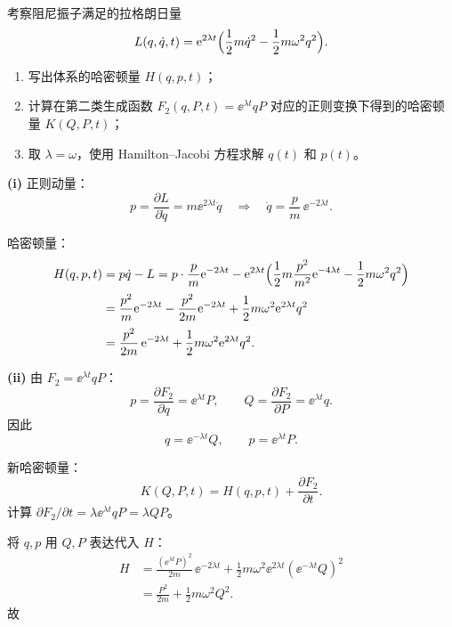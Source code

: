 \begin{question}[阻尼振子]
考察阻尼振子满足的拉格朗日量
\[
L(q,\dot q,t)=\mathrm{e}^{2\lambda t}
\Bigl(\frac12 m\dot q^{2}-\frac12 m\omega^{2}q^{2}\Bigr).
\]

\begin{enumerate}[label=(\roman*)]
  \item 写出体系的哈密顿量 $H(q,p,t)$；
  \item 计算在第二类生成函数 $F_{2}(q,P,t)=\ee^{\lambda t}qP$ 对应的正则变换下得到的哈密顿量 $K(Q,P,t)$；
  \item 取 $\lambda=\omega$，使用 Hamilton--Jacobi 方程求解 $q(t)$ 和 $p(t)$。
\end{enumerate}

\begin{solution}

\textbf{(i)} 正则动量：
\[
p=\frac{\partial L}{\partial\dot q}=m\ee^{2\lambda t}\dot q
\quad\Longrightarrow\quad
\dot q=\frac{p}{m}\,\ee^{-2\lambda t}.
\]

哈密顿量：
\begin{align*}
H(q,p,t)&=p\dot q-L
=p\cdot\frac{p}{m}\mathrm{e}^{-2\lambda t}
-\mathrm{e}^{2\lambda t}\Bigl(\frac12 m\frac{p^{2}}{m^{2}}\mathrm{e}^{-4\lambda t}
-\frac12 m\omega^{2}q^{2}\Bigr) \\[2pt]
&=\frac{p^{2}}{m}\mathrm{e}^{-2\lambda t}
-\frac{p^{2}}{2m}\mathrm{e}^{-2\lambda t}
+\frac12 m\omega^{2}\mathrm{e}^{2\lambda t}q^{2} \\[2pt]
&=\frac{p^{2}}{2m}\,\mathrm{e}^{-2\lambda t}
+\frac12 m\omega^{2}\mathrm{e}^{2\lambda t}q^{2}.
\end{align*}

\textbf{(ii)} 由 $F_{2}=\ee^{\lambda t}qP$：
\[
p=\frac{\partial F_{2}}{\partial q}=\ee^{\lambda t}P,\qquad
Q=\frac{\partial F_{2}}{\partial P}=\ee^{\lambda t}q.
\]
因此
\[
q=\ee^{-\lambda t}Q,\qquad p=\ee^{\lambda t}P.
\]

新哈密顿量：
\[
K(Q,P,t)=H(q,p,t)+\frac{\partial F_{2}}{\partial t}.
\]
计算 $\partial F_{2}/\partial t=\lambda\ee^{\lambda t}qP=\lambda QP$。

将 $q,p$ 用 $Q,P$ 表达代入 $H$：
\begin{align*}
H&=\frac{(\ee^{\lambda t}P)^{2}}{2m}\,\ee^{-2\lambda t}
+\frac12 m\omega^{2}\ee^{2\lambda t}(\ee^{-\lambda t}Q)^{2} \\[2pt]
&=\frac{P^{2}}{2m}+\frac12 m\omega^{2}Q^{2}.
\end{align*}
故



\end{solution}
\end{question}
